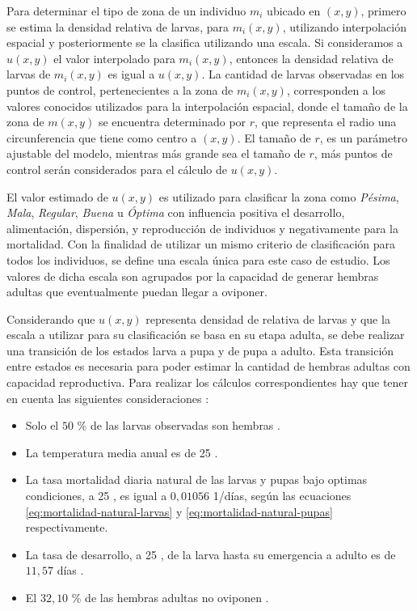 Para determinar el tipo de zona de un individuo $m_{i}$ ubicado en $(x,y)$, primero se estima la
densidad relativa de larvas, para $m_{i}(x,y)$, utilizando interpolación espacial y posteriormente
se la clasifica utilizando una escala. Si consideramos a $u(x,y)$ el valor interpolado para
$m_{i}(x,y)$, entonces la densidad relativa de larvas de $m_{i}(x,y)$ es igual a $u(x,y)$. La
cantidad de larvas observadas en los puntos de control, pertenecientes a la zona de $m_{i}(x,y)$,
corresponden a los valores conocidos utilizados para la interpolación espacial, donde el tamaño de
la zona de $m(x,y)$ se encuentra determinado por $r$, que representa el radio una circunferencia
que tiene como centro a $(x,y)$. El tamaño de $r$, es un parámetro ajustable del modelo, mientras
más grande sea el tamaño de $r$, más puntos de control serán considerados para el cálculo de
$u(x,y)$.

El valor estimado de $u(x,y)$ es utilizado para clasificar la zona como \textit{Pésima},
\textit{Mala}, \textit{Regular}, \textit{Buena} u \textit{Óptima} con influencia positiva el
desarrollo, alimentación, dispersión, y reproducción de individuos y negativamente para la
mortalidad. Con la finalidad de utilizar un mismo criterio de clasificación para todos los
individuos, se define una escala única para este caso de estudio. Los valores de dicha escala son
agrupados por la capacidad de generar hembras adultas que eventualmente puedan llegar a oviponer.

Considerando que $u(x,y)$ representa densidad de relativa de larvas y que la escala a utilizar
para su clasificación se basa en su etapa adulta, se debe realizar una transición de los estados
larva a pupa y de pupa a adulto. Esta transición entre estados es necesaria para poder estimar la
cantidad de hembras adultas con capacidad reproductiva. Para realizar los cálculos
correspondientes hay que tener en cuenta las siguientes consideraciones :

\begin{itemize}
    \item Solo el $50$ \% de las larvas observadas son hembras \cite{otero2006stochastic, manrique1998desarrollo}.
    \item La temperatura media anual es de 25 \textcelsius \cite{website:mspbsHistoria2014}.
    \item La tasa mortalidad diaria natural de las larvas y pupas bajo optimas condiciones, a 25 \textcelsius, es igual a $0,01056$ 1/días, según las ecuaciones \eqref{eq:mortalidad-natural-larvas} y \eqref{eq:mortalidad-natural-pupas} respectivamente.
    \item La tasa de desarrollo, a 25 \textcelsius, de la larva hasta su emergencia a adulto es de $11,57$ días \cite{rueda1990temperature}.
    \item El $32,10$ \% de las hembras adultas no oviponen \cite{osoriopontificia}.
\end{itemize}

